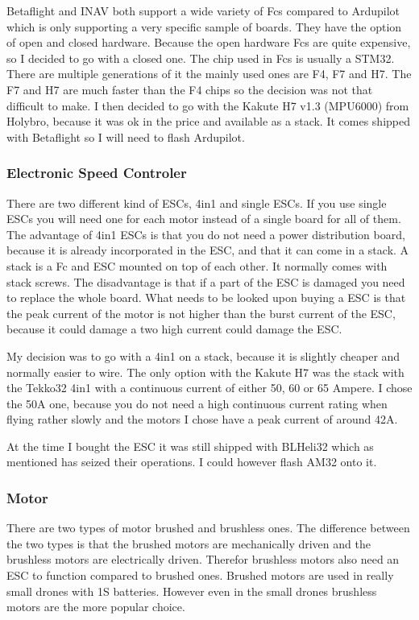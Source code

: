 \documentclass{article}
\begin{document}
	Betaflight and INAV both support a wide variety of Fcs compared to Ardupilot which is only supporting a very specific sample of boards\cite{FcSupport}. They have the option of open and closed hardware. Because the open hardware Fcs are quite expensive, so I decided to go with a closed one. The chip used in Fcs is usually a STM32. There are multiple generations of it the mainly used ones are F4, F7 and H7. The F7 and H7 are much faster than the F4 chips so the decision was not that difficult to make. I then decided to go with the Kakute H7 v1.3 (MPU6000)\cite{KakuteH7} from Holybro, because it was ok in the price and available as a stack. It comes shipped with Betaflight so I will need to flash Ardupilot. 

	\subsubsection[ESC]{Electronic Speed Controler}
	There are two different kind of ESCs, 4in1 and single ESCs. If you use single ESCs you will need one for each motor instead of a single board for all of them. The advantage of 4in1 ESCs is that you do not need a power distribution board, because it is already incorporated in the ESC, and that it can come in a stack. A stack is a Fc and ESC mounted on top of each other. It normally comes with stack screws. The disadvantage is that if a part of the ESC is damaged you need to replace the whole board. What needs to be looked upon buying a ESC is that the peak current of the motor is not higher than the burst current of the ESC, because it could damage a two high current could damage the ESC.
	
	My decision was to go with a 4in1 on a stack, because it is slightly cheaper and normally easier to wire. The only option with the Kakute H7 was the stack with the Tekko32 4in1 with a continuous current of either 50, 60 or 65 Ampere. I chose the 50A\cite{Tekko32} one, because you do not need a high continuous current rating when flying rather slowly and the motors I chose have a peak current of around 42A. 
	
	At the time I bought the ESC it was still shipped with BLHeli32 which as mentioned has seized their operations. I could however flash AM32 onto it.

	\subsubsection{Motor}
	There are two types of motor brushed and brushless ones. The difference between the two types is that the brushed motors are mechanically driven and the brushless motors are electrically driven. Therefor brushless motors also need an ESC to function compared to brushed ones. Brushed motors are used in really small drones with 1S batteries. However even in the small drones brushless motors are the more popular choice\cite{brush/lessmotors}. 
	
\end{document}
